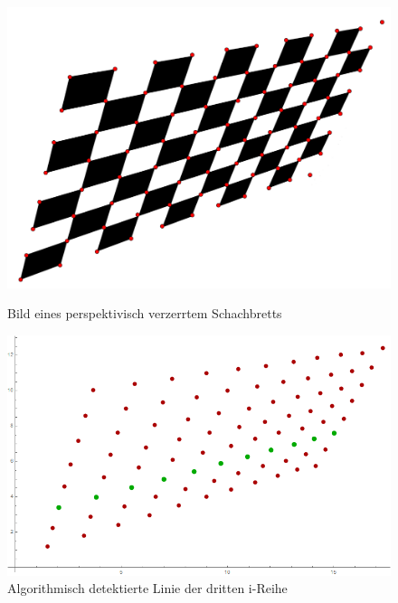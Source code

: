 \begin{figure}[!htb]
	\includegraphics[width=\linewidth]{images/perspektivisch.png}
	\caption{Bild eines perspektivisch verzerrtem Schachbretts}
	\label{fig:Extreme3}
	\endminipage\hfill
	\includegraphics[width=\linewidth]{images/AlgPerspektifisch.png}
	\caption{Algorithmisch detektierte Linie der dritten i-Reihe}
	\label{fig:Extreme4}
	\endminipage\hfill
\end{figure}


